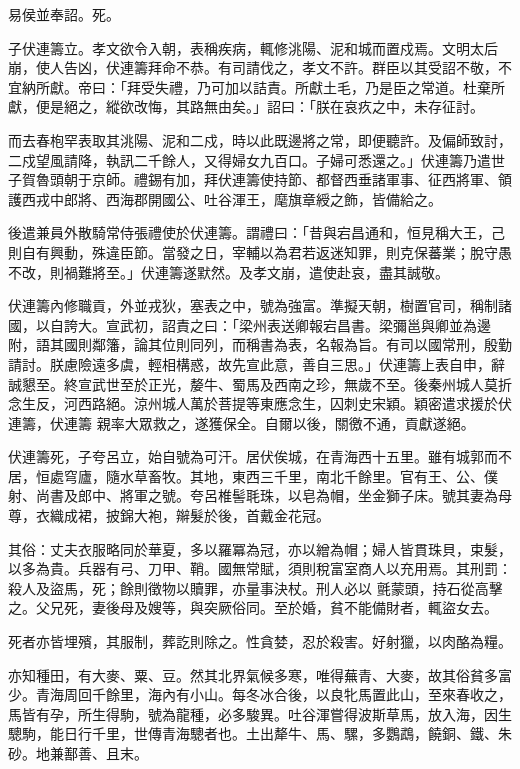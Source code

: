 \begin{pinyinscope}
 易侯並奉詔。死。



 子伏連籌立。孝文欲令入朝，表稱疾病，輒修洮陽、泥和城而置戍焉。文明太后崩，使人告凶，伏連籌拜命不恭。有司請伐之，孝文不許。群臣以其受詔不敬，不宜納所獻。帝曰：「拜受失禮，乃可加以詰責。所獻土毛，乃是臣之常道。杜棄所獻，便是絕之，縱欲改悔，其路無由矣。」詔曰：「朕在哀疚之中，未存征討。



 而去春枹罕表取其洮陽、泥和二戍，時以此既邊將之常，即便聽許。及偏師致討，二戍望風請降，執訊二千餘人，又得婦女九百口。子婦可悉還之。」伏連籌乃遣世子賀魯頭朝于京師。禮錫有加，拜伏連籌使持節、都督西垂諸軍事、征西將軍、領護西戎中郎將、西海郡開國公、吐谷渾王，麾旗章綬之飾，皆備給之。



 後遣兼員外散騎常侍張禮使於伏連籌。謂禮曰：「昔與宕昌通和，恒見稱大王，己則自有興動，殊違臣節。當發之日，宰輔以為君若返迷知罪，則克保蕃業；脫守愚
 不改，則禍難將至。」伏連籌遂默然。及孝文崩，遣使赴哀，盡其誠敬。



 伏連籌內修職貢，外並戎狄，塞表之中，號為強富。準擬天朝，樹置官司，稱制諸國，以自誇大。宣武初，詔責之曰：「梁州表送卿報宕昌書。梁彌邕與卿並為邊附，語其國則鄰籓，論其位則同列，而稱書為表，名報為旨。有司以國常刑，殷勤請討。朕慮險遠多虞，輕相構惑，故先宣此意，善自三思。」伏連籌上表自申，辭誠懇至。終宣武世至於正光，嫠牛、蜀馬及西南之珍，無歲不至。後秦州城人莫折念生反，河西路絕。涼州城人萬於菩提等東應念生，囚刺史宋穎。穎密遣求援於伏連籌，伏連籌
 親率大眾救之，遂獲保全。自爾以後，關徼不通，貢獻遂絕。



 伏連籌死，子夸呂立，始自號為可汗。居伏俟城，在青海西十五里。雖有城郭而不居，恒處穹廬，隨水草畜牧。其地，東西三千里，南北千餘里。官有王、公、僕射、尚書及郎中、將軍之號。夸呂椎髻毦珠，以皂為帽，坐金獅子床。號其妻為母尊，衣織成裙，披錦大袍，辮髮於後，首戴金花冠。



 其俗：丈夫衣服略同於華夏，多以羅冪為冠，亦以繒為帽；婦人皆貫珠貝，束髮，以多為貴。兵器有弓、刀甲、鞘。國無常賦，須則稅富室商人以充用焉。其刑罰：殺人及盜馬，死；餘則徵物以贖罪，亦量事決杖。刑人必以
 氈蒙頭，持石從高擊之。父兄死，妻後母及嫂等，與突厥俗同。至於婚，貧不能備財者，輒盜女去。



 死者亦皆埋殯，其服制，葬訖則除之。性貪婪，忍於殺害。好射獵，以肉酪為糧。



 亦知種田，有大麥、粟、豆。然其北界氣候多寒，唯得蕪青、大麥，故其俗貧多富少。青海周回千餘里，海內有小山。每冬冰合後，以良牝馬置此山，至來春收之，馬皆有孕，所生得駒，號為龍種，必多駿異。吐谷渾嘗得波斯草馬，放入海，因生驄駒，能日行千里，世傳青海驄者也。土出犛牛、馬、騾，多鸚鵡，饒銅、鐵、朱砂。地兼鄯善、且末。




\end{pinyinscope}
